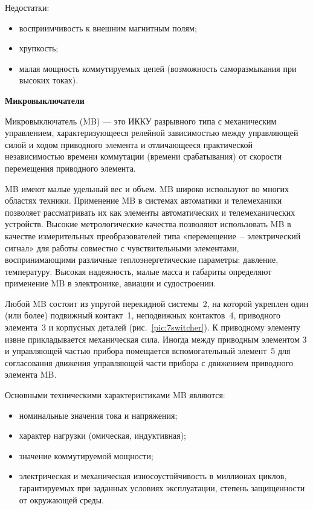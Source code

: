 Недостатки:
\begin{itemize}
\item восприимчивость к внешним магнитным полям;
\item хрупкость;
\item малая мощность коммутируемых цепей (возможность саморазмыкания при высоких токах).
\end{itemize}

\begin{flushleft}
\textbf{Микровыключатели}
\end{flushleft}

Микровыключатель (MB) --- это ИККУ разрывного типа с механическим управлением, характеризующееся релейной зависимостью между управляющей силой и ходом приводного элемента и отличающееся практической независимостью времени коммутации (времени срабатывания) от скорости перемещения приводного элемента.

MB имеют малые удельный вес и объем. MB широко используют во многих областях техники. Применение MB в системах автоматики и телемеханики позволяет рассматривать их как элементы автоматических и телемеханических  устройств. Высокие метрологические качества позволяют использовать MB в качестве измерительных преобразователей типа «перемещение~-- электрический сигнал» для работы совместно с чувствительными элементами, воспринимающими различные теплоэнергетические параметры: давление, температуру. Высокая надежность, малые масса и габариты определяют применение MB в электронике, авиации и судостроении.

Любой MB состоит из упругой перекидной системы~2, на которой укреплен один (или более) подвижный контакт~1, неподвижных контактов~4, приводного элемента~3 и корпусных деталей (рис.~\ref{pic:7switcher}). К приводному элементу извне прикладывается механическая сила. Иногда между приводным элементом 3 и управляющей частью прибора помещается вспомогательный элемент~5 для согласования движения управляющей части прибора с движением приводного элемента MB. 

Основными техническими характеристиками MB являются:
\begin{itemize}
\item номинальные значения тока и напряжения;
\item характер нагрузки (омическая, индуктивная);
\item значение коммутируемой мощности;
\item электрическая и механическая износоустойчивость в миллионах циклов, гарантируемых при заданных условиях эксплуатации, степень защищенности от окружающей среды.
\end{itemize}


